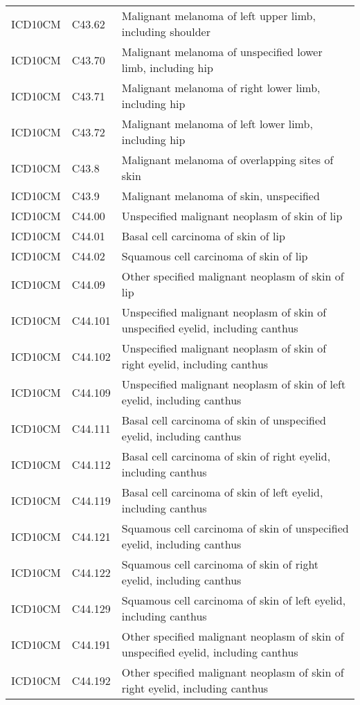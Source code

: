 \begin{longtable}{p{}p{}p{}}
  ICD10CM & C43.62 & Malignant melanoma of left upper limb, including shoulder \\ 
  ICD10CM & C43.70 & Malignant melanoma of unspecified lower limb, including hip \\ 
  ICD10CM & C43.71 & Malignant melanoma of right lower limb, including hip \\ 
  ICD10CM & C43.72 & Malignant melanoma of left lower limb, including hip \\ 
  ICD10CM & C43.8 & Malignant melanoma of overlapping sites of skin \\ 
  ICD10CM & C43.9 & Malignant melanoma of skin, unspecified \\ 
  ICD10CM & C44.00 & Unspecified malignant neoplasm of skin of lip \\ 
  ICD10CM & C44.01 & Basal cell carcinoma of skin of lip \\ 
  ICD10CM & C44.02 & Squamous cell carcinoma of skin of lip \\ 
  ICD10CM & C44.09 & Other specified malignant neoplasm of skin of lip \\ 
  ICD10CM & C44.101 & Unspecified malignant neoplasm of skin of unspecified eyelid, including canthus \\ 
  ICD10CM & C44.102 & Unspecified malignant neoplasm of skin of right eyelid, including canthus \\ 
  ICD10CM & C44.109 & Unspecified malignant neoplasm of skin of left eyelid, including canthus \\ 
  ICD10CM & C44.111 & Basal cell carcinoma of skin of unspecified eyelid, including canthus \\ 
  ICD10CM & C44.112 & Basal cell carcinoma of skin of right eyelid, including canthus \\ 
  ICD10CM & C44.119 & Basal cell carcinoma of skin of left eyelid, including canthus \\ 
  ICD10CM & C44.121 & Squamous cell carcinoma of skin of unspecified eyelid, including canthus \\ 
  ICD10CM & C44.122 & Squamous cell carcinoma of skin of right eyelid, including canthus \\ 
  ICD10CM & C44.129 & Squamous cell carcinoma of skin of left eyelid, including canthus \\ 
  ICD10CM & C44.191 & Other specified malignant neoplasm of skin of unspecified eyelid, including canthus \\ 
  ICD10CM & C44.192 & Other specified malignant neoplasm of skin of right eyelid, including canthus \\ 

\end{longtable}
